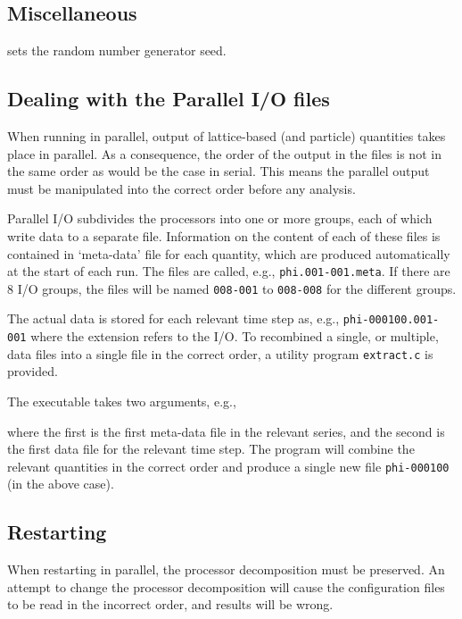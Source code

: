 \subsection{Miscellaneous}


sets the random number generator seed.

\subsection{Dealing with the Parallel I/O files}

When running in parallel, output of lattice-based (and particle)
quantities takes place in parallel. As a consequence, the order
of the output in the files is not in the same order as would be
the case in serial. This means the parallel output must be
manipulated into the correct order before any analysis.

Parallel I/O subdivides the processors into one or more groups,
each of which write data to a separate file. Information on the
content of each of these files is contained in `meta-data' file
for each quantity, which are produced automatically at the start
of each run. The files are called, e.g., \texttt{phi.001-001.meta}.
If there are 8 I/O groups, the files will be named \texttt{008-001}
to \texttt{008-008} for the different groups.

The actual data is stored for each relevant time step as, e.g.,
\texttt{phi-000100.001-001} where the extension refers to the
I/O. To recombined a single, or multiple, data files into a
single file in the correct order, a utility program
\texttt{extract.c} is provided.

The executable takes two arguments, e.g.,


where  the first is the first meta-data file in the relevant series,
and the second is the first data file for the relevant time step. The
program will combine the relevant quantities in the correct order
and produce a single new file \texttt{phi-000100} (in the above case).

\subsection{Restarting}

When restarting in parallel, the processor decomposition must be
preserved. An attempt to change the processor decomposition will
cause the configuration files to be read in the incorrect order,
and results will be wrong.

